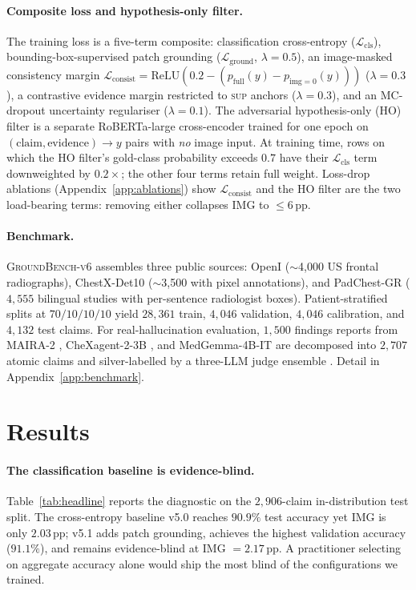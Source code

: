 \documentclass{article}
\begin{document}
\paragraph{Composite loss and hypothesis-only filter.} The training loss
is a five-term composite: classification cross-entropy
($\mathcal{L}_{\mathrm{cls}}$), bounding-box-supervised patch grounding
($\mathcal{L}_{\mathrm{ground}}$, $\lambda = 0.5$), an image-masked
consistency margin
$\mathcal{L}_{\mathrm{consist}} = \mathrm{ReLU}(0.2 - (p_{\mathrm{full}}(y)
- p_{\mathrm{img}=0}(y)))$ ($\lambda = 0.3$), a contrastive evidence
margin restricted to \textsc{sup} anchors ($\lambda = 0.3$), and an
MC-dropout uncertainty regulariser ($\lambda = 0.1$). The adversarial
hypothesis-only (HO) filter is a separate RoBERTa-large cross-encoder
trained for one epoch on $(\text{claim}, \text{evidence}) \to y$ pairs
with \emph{no} image input. At training time, rows on which the HO
filter's gold-class probability exceeds $0.7$ have their
$\mathcal{L}_{\mathrm{cls}}$ term downweighted by $0.2\times$; the other
four terms retain full weight. Loss-drop ablations
(Appendix~\ref{app:ablations}) show $\mathcal{L}_{\mathrm{consist}}$ and
the HO filter are the two load-bearing terms: removing either collapses
IMG to $\leq 6$\,pp.

\paragraph{Benchmark.} \textsc{GroundBench-v6} assembles three
public sources: OpenI \citep{demner2016openi}
($\sim$4{,}000 US frontal radiographs), ChestX-Det10
\citep{liu2020chestxdet} ($\sim$3{,}500 with pixel annotations), and
PadChest-GR \citep{castro2024padchestgr} ($4{,}555$ bilingual studies
with per-sentence radiologist boxes). Patient-stratified splits at
$70/10/10/10$ yield $28{,}361$ train, $4{,}046$ validation, $4{,}046$
calibration, and $4{,}132$ test claims. For real-hallucination
evaluation, $1{,}500$ findings reports from MAIRA-2
\citep{bannur2024maira2}, CheXagent-2-3B \citep{chen2024chexagent}, and
MedGemma-4B-IT \citep{google2024medgemma} are decomposed into $2{,}707$
atomic claims and silver-labelled by a three-LLM judge ensemble
\citep{ostmeier2024green}. Detail in Appendix~\ref{app:benchmark}.

\section{Results}
\label{sec:results}

\paragraph{The classification baseline is evidence-blind.}
Table~\ref{tab:headline} reports the diagnostic on the $2{,}906$-claim
in-distribution test split. The cross-entropy baseline v5.0 reaches
$90.9\%$ test accuracy yet IMG is only $2.03$\,pp; v5.1 adds patch
grounding, achieves the highest validation accuracy ($91.1\%$), and
remains evidence-blind at IMG $= 2.17$\,pp. A practitioner selecting on
aggregate accuracy alone would ship the most blind of the configurations
we trained.
\end{document}
